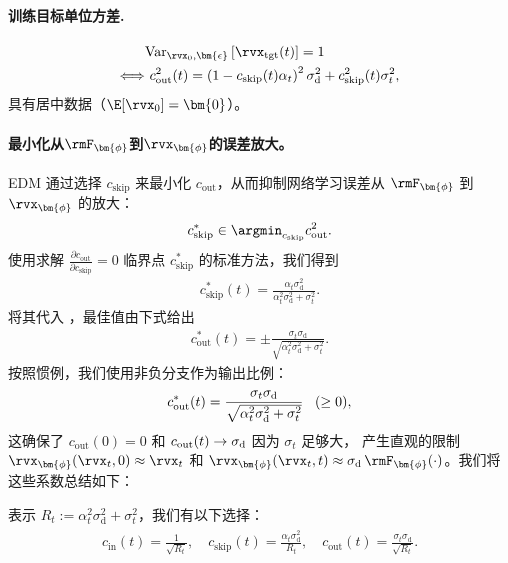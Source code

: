 \paragraph{ 训练目标单位方差.}
\begin{align}\label{eq:c-out}
    &\text{Var}_{\rvx_0,\bm{\epsilon}}\left[ \rvx_{\mathrm{tgt}}(t) \right] = 1 \nonumber
    \\ \Longleftrightarrow &~c_{\mathrm{out}}^2(t)  = \left(1-c_{\mathrm{skip}}(t)\alpha_t\right)^2 \sigma_{\mathrm{d}}^2 + c_{\mathrm{skip}}^2(t)\sigma_t^2,
\end{align}
具有居中数据（$\E[\rvx_0]=\bm{0}$）。
\paragraph{最小化从$\rmF_{\bm{\phi}}$到$\rvx_{\bm{\phi}}$的误差放大。} EDM 通过选择 $c_{\mathrm{skip}}$ 来最小化 $c_{\mathrm{out}}$，从而抑制网络学习误差从 $\rmF_{\bm{\phi}}$ 到 $\rvx_{\bm{\phi}}$ 的放大：
\[
c_{\mathrm{skip}}^* \in \argmin_{c_{\mathrm{skip}}}  c_{\mathrm{out}}^2.
\]
使用求解 $\frac{\partial c_{\mathrm{out}}}{\partial c_{\mathrm{skip}}} = 0$ 临界点 $c_{\mathrm{skip}}^*$ 的标准方法，我们得到
\begin{align*}
    c_{\mathrm{skip}}^*(t) = \frac{\alpha_t \sigma_{\mathrm{d}}^2 }{\alpha_t^2 \sigma_{\mathrm{d}}^2  + \sigma_t^2}.
\end{align*}
将其代入 ，最佳值由下式给出
\begin{align*}
    c_{\mathrm{out}}^*(t) = \pm \frac{\sigma_t \sigma_{\mathrm{d}} }{\sqrt{\alpha_t^2 \sigma_{\mathrm{d}}^2  + \sigma_t^2}}.
\end{align*}
按照惯例，我们使用非负分支作为输出比例：
\[
c_{\mathrm{out}}^*(t) = \frac{\sigma_t \sigma_{\text d}}
{\sqrt{\alpha_t^2 \sigma_{\text d}^2 + \sigma_t^2}}
\;\;\;(\ge 0),
\]
这确保了 $c_{\mathrm{out}}(0)=0$ 和 $c_{\mathrm{out}}(t)\to\sigma_{\text d}$ 因为 $\sigma_t$ 足够大，
产生直观的限制 $\rvx_{\bm{\phi}}(\rvx_t,0)\approx \rvx_t$ 和
$\rvx_{\bm{\phi}}(\rvx_t,t)\approx \sigma_{\text d}\,\rmF_{\bm{\phi}}(\cdot)$。我们将这些系数总结如下：
\begin{mdframed}
表示 $R_t := \alpha_t^2 \sigma_{\mathrm{d}}^2+ \sigma_t^2$，我们有以下选择：
    \begin{align}\label{eq:edm-coeff}
        \begin{aligned}
            c_{\mathrm{in}}(t)  = \frac{1}{\sqrt{R_t}}, \quad
            c_{\mathrm{skip}}(t) = \frac{\alpha_t \sigma_{\mathrm{d}}^2 }{R_t}, \quad
            c_{\mathrm{out}}(t) =  \frac{\sigma_t \sigma_{\mathrm{d}} }{\sqrt{R_t}}.
        \end{aligned}
    \end{align}
\end{mdframed}

